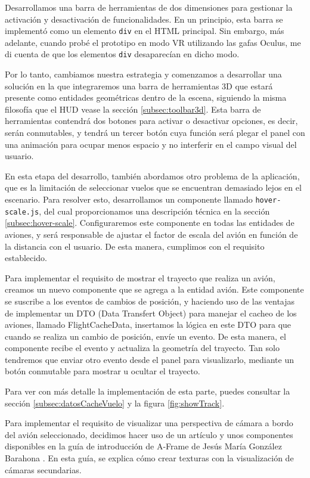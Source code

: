 \documentclass[a4paper, 11pt]{book}
\begin{document}
Desarrollamos una barra de herramientas de dos dimensiones para gestionar la activación y desactivación de funcionalidades. En un principio, esta barra se implementó como un elemento \texttt{div} en el HTML principal. Sin embargo, más adelante, cuando probé el prototipo en modo VR utilizando las gafas Oculus, me di cuenta de que los elementos \texttt{div} desaparecían en dicho modo.

Por lo tanto, cambiamos nuestra estrategia y comenzamos a desarrollar una solución en la que integraremos una barra de herramientas 3D que estará presente como entidades geométricas dentro de la escena, siguiendo la misma filosofía que el HUD vease la sección \ref{subsec:toolbar3d}. Esta barra de herramientas contendrá dos botones para activar o desactivar opciones, es decir, serán conmutables, y tendrá un tercer botón cuya función será plegar el panel con una animación para ocupar menos espacio y no interferir en el campo visual del usuario.

En esta etapa del desarrollo, también abordamos otro problema de la aplicación, que es la limitación de seleccionar vuelos que se encuentran demasiado lejos en el escenario. Para resolver esto, desarrollamos un componente llamado \texttt{hover-scale.js}, del cual proporcionamos una descripción técnica en la sección \ref{subsec:hover-scale}. Configuraremos este componente en todas las entidades de aviones, y será responsable de ajustar el factor de escala del avión en función de la distancia con el usuario. De esta manera, cumplimos con el requisito establecido.

Para implementar el requisito de mostrar el trayecto que realiza un avión, creamos un nuevo componente que se agrega a la entidad avión. Este componente se suscribe a los eventos de cambios de posición, y haciendo uso de las ventajas de implementar un DTO (Data Transfert Object) para manejar el cacheo de los aviones, llamado FlightCacheData, insertamos la lógica en este DTO para que cuando se realiza un cambio de posición, envíe un evento. De esta manera, el componente recibe el evento y actualiza la geometría del trayecto. Tan solo tendremos que enviar otro evento desde el panel para visualizarlo, mediante un botón conmutable para mostrar u ocultar el trayecto.

Para ver con más detalle la implementación de esta parte, puedes consultar la sección \ref{subsec:datosCacheVuelo} y la figura \ref{fig:showTrack}.

Para implementar el requisito de visualizar una perspectiva de cámara a bordo del avión seleccionado, decidimos hacer uso de un artículo y unos componentes disponibles en la guía de introducción de A-Frame de Jesús María González Barahona \cite{aframe_notes}. En esta guía, se explica cómo crear texturas con la visualización de cámaras secundarias.
\end{document}
